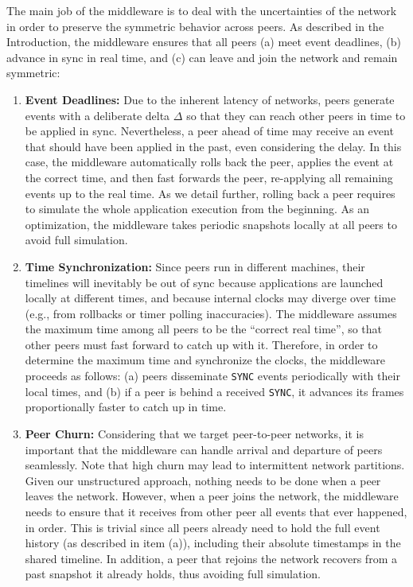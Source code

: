 \documentclass[fleqn,10pt]{SelfArx}
\newcommand{\code}[1]  {\texttt{\footnotesize{#1}}}
\begin{document}
The main job of the middleware is to deal with the uncertainties of the
network in order to preserve the symmetric behavior across peers.
As described in the Introduction, the middleware ensures that all peers
    (a) meet event deadlines,
    (b) advance in sync in real time, and
    (c) can leave and join the network and remain symmetric:
%
\begin{enumerate}
\item \textbf{Event Deadlines:}
Due to the inherent latency of networks, peers generate events with a
deliberate delta $\Delta$ so that they can reach other peers in time to be
applied in sync.
Nevertheless, a peer ahead of time may receive an event that should have been
applied in the past, even considering the delay.
In this case, the middleware automatically rolls back the peer, applies the
event at the correct time, and then fast forwards the peer, re-applying all
remaining events up to the real time.
As we detail further, rolling back a peer requires to simulate the whole
application execution from the beginning.
As an optimization, the middleware takes periodic snapshots locally at all
peers to avoid full simulation.
%
\item \textbf{Time Synchronization:}
Since peers run in different machines, their timelines will inevitably be out
of sync because applications are launched locally at different times, and
because internal clocks may diverge over time (e.g., from rollbacks or timer
polling inaccuracies).
The middleware assumes the maximum time among all peers to be the
``correct real time'', so that other peers must fast forward to catch up with
it.
Therefore, in order to determine the maximum time and synchronize the clocks,
the middleware proceeds as follows:
    (a) peers disseminate \code{SYNC} events periodically with their local
        times, and
    (b) if a peer is behind a received \code{SYNC}, it advances its frames
        proportionally faster to catch up in time.
%
\item \textbf{Peer Churn:}
Considering that we target peer-to-peer networks, it is important that the
middleware can handle arrival and departure of peers seamlessly.
Note that high churn may lead to intermittent network partitions.
Given our unstructured approach, nothing needs to be done when a peer leaves
the network.
However, when a peer joins the network, the middleware needs to ensure that it
receives from other peer all events that ever happened, in order.
This is trivial since all peers already need to hold the full event history (as
described in item (a)), including their absolute timestamps in the shared
timeline.
In addition, a peer that rejoins the network recovers from a past snapshot it
already holds, thus avoiding full simulation.
\end{enumerate}
\end{document}
